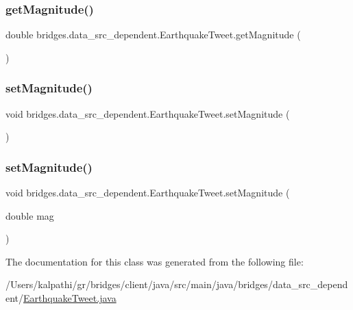 \subsubsection{\texorpdfstring{get\+Magnitude()}{getMagnitude()}}
{\footnotesize\ttfamily double bridges.\+data\+\_\+src\+\_\+dependent.\+Earthquake\+Tweet.\+get\+Magnitude (\begin{DoxyParamCaption}{ }\end{DoxyParamCaption})}

\mbox{\label{classbridges_1_1data__src__dependent_1_1_earthquake_tweet_a49880f314eee430098ca347cd07ff470}} 
\subsubsection{\texorpdfstring{set\+Magnitude()}{setMagnitude()}\hspace{0.1cm}{\footnotesize\ttfamily [1/2]}}
{\footnotesize\ttfamily void bridges.\+data\+\_\+src\+\_\+dependent.\+Earthquake\+Tweet.\+set\+Magnitude (\begin{DoxyParamCaption}{ }\end{DoxyParamCaption})}

\mbox{\label{classbridges_1_1data__src__dependent_1_1_earthquake_tweet_a763d8a261a563e66af95c5a97850ecc0}} 
\subsubsection{\texorpdfstring{set\+Magnitude()}{setMagnitude()}\hspace{0.1cm}{\footnotesize\ttfamily [2/2]}}
{\footnotesize\ttfamily void bridges.\+data\+\_\+src\+\_\+dependent.\+Earthquake\+Tweet.\+set\+Magnitude (\begin{DoxyParamCaption}\item[{double}]{mag }\end{DoxyParamCaption})}



The documentation for this class was generated from the following file\+:\begin{DoxyCompactItemize}
\item 
/\+Users/kalpathi/gr/bridges/client/java/src/main/java/bridges/data\+\_\+src\+\_\+dependent/\mbox{\hyperlink{_earthquake_tweet_8java}{Earthquake\+Tweet.\+java}}\end{DoxyCompactItemize}
